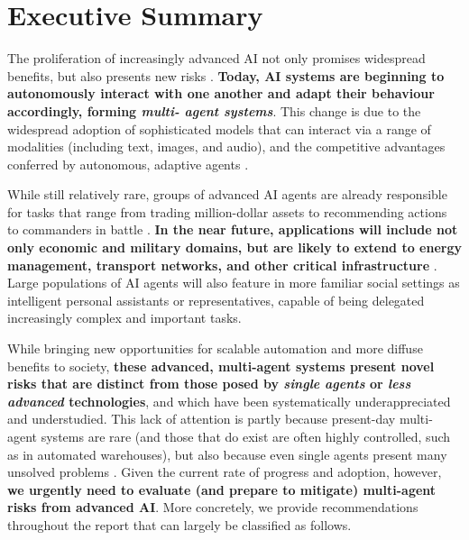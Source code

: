 \section*{Executive Summary}
\label{sec:executive_summary}


The proliferation of increasingly advanced AI not only promises widespread benefits, but also presents new risks \citep{Bengio2024a,Chan2023-aj}.
\textbf{Today, AI systems are beginning to autonomously interact with one another and adapt their behaviour accordingly, forming \textit{multi- agent systems}}.
This change is due to the widespread adoption of sophisticated models that can interact via a range of modalities (including text, images, and audio), and the competitive advantages conferred by autonomous, adaptive agents \citep{GDM_agents,Anthropic_agents,OpenAI_agents}.

While still relatively rare, groups of advanced AI agents are already responsible for tasks that range from trading million-dollar assets \citep{Ferreira2021,amplify_aieq,Sun2023_rl_qt} to recommending actions to commanders in battle \citep{palantir_aip_defense,manson2024ai,Black2024}.
\textbf{In the near future, applications will include not only economic and military domains, but are likely to extend to energy management, transport networks, and other critical infrastructure} \citep{mayorkas2024roles, Camacho2024}.
Large populations of AI agents will also feature in more familiar social settings as intelligent personal assistants or representatives, capable of being delegated increasingly complex and important tasks.

While bringing new opportunities for scalable automation and more diffuse benefits to society, \textbf{these advanced, multi-agent systems present novel risks that are distinct from those posed by \textit{single agents} or \textit{less advanced} technologies}, and which have been systematically underappreciated and understudied.
This lack of attention is partly because present-day multi-agent systems are rare (and those that do exist are often highly controlled, such as in automated warehouses), but also because even single agents present many unsolved problems \citep{Amodei2016,Hendrycks2021,Anwar2024}.
Given the current rate of progress and adoption, however, \textbf{we urgently need to evaluate (and prepare to mitigate) multi-agent risks from advanced AI}.
More concretely, we provide recommendations throughout the report that can largely be classified as follows.

